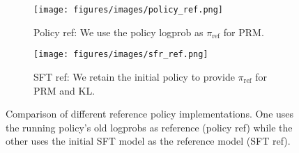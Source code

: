\begin{figure}[t]
    \centering
    \begin{subfigure}{0.44\textwidth}
        \centering
        \texttt{[image: figures/images/policy\_ref.png]}
        \caption{Policy ref: We use the policy logprob as $ \pi_{\text{ref}}$ for PRM.} %
        \label{fig:policy_ref}
    \end{subfigure}
    \hfill %
    \begin{subfigure}{0.54\textwidth}
        \centering
        \texttt{[image: figures/images/sfr\_ref.png]}
        \caption{SFT ref: We retain the initial policy to provide  $ \pi_{\text{ref}}$ for PRM and KL.} %
        \label{fig:sft_ref}
    \end{subfigure}
    \caption{Comparison of different reference policy implementations. One uses the running policy's old logprobs as reference (policy ref) while the other uses the initial SFT model as the reference model (SFT ref).} %
    \label{fig:online_prm}
\end{figure}